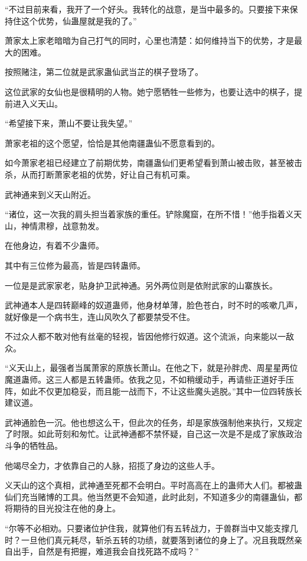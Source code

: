 
\begin{this_body}

“不过目前来看，我开了一个好头。我转化的战意，是当中最多的。只要接下来保持住这个优势，仙蛊屋就是我的了。”

萧家太上家老暗暗为自己打气的同时，心里也清楚：如何维持当下的优势，才是最大的困难。

按照赌注，第二位就是武家蛊仙武当芷的棋子登场了。

这位武家的女仙也是很精明的人物。她宁愿牺牲一些修为，也要让选中的棋子，提前进入义天山。

“希望接下来，萧山不要让我失望。”

萧家老祖的这个愿望，恰恰是其他南疆蛊仙不愿意看到的。

如今萧家老祖已经建立了前期优势，南疆蛊仙们更希望看到萧山被击败，甚至被击杀，从而打断萧家老祖的优势，好让自己有机可乘。

武神通来到义天山附近。

“诸位，这一次我的肩头担当着家族的重任。铲除魔窟，在所不惜！”他手指着义天山，神情肃穆，战意勃发。

在他身边，有着不少蛊师。

其中有三位修为最高，皆是四转蛊师。

一位是是武家家老，贴身护卫武神通。另外两位则是依附武家的山寨族长。

武神通本人是四转巅峰的奴道蛊师，他身材单薄，脸色苍白，时不时的咳嗽几声，就好像是一个病书生，连山风吹久了都要禁受不住。

不过众人都不敢对他有丝毫的轻视，皆因他修行奴道。这个流派，向来能以一敌众。

“义天山上，最强者当属萧家的原族长萧山。在他之下，就是孙胖虎、周星星两位魔道蛊师。这三人都是五转蛊师。依我之见，不如稍缓动手，再请些正道好手压阵，如此不仅更加稳妥，而且能一战而下，不让这些魔头逃脱。”其中一位四转族长建议道。

武神通脸色一沉。他也想这么干，但此次的任务，却是家族强制他来执行，又规定了时限。如此苛刻和匆忙。让武神通都不禁怀疑，自己这一次是不是成了家族政治斗争的牺牲品。

他竭尽全力，才依靠自己的人脉，招揽了身边的这些人手。

义天山的这个真相，武神通至死都不会明白。平时高高在上的蛊师大人们。都被蛊仙们充当赌博的工具。他当然更不会知道，此时此刻，不知道多少的南疆蛊仙，都将期待的目光投注在他的身上。

“尔等不必相劝。只要诸位护住我，就算他们有五转战力，于兽群当中又能支撑几时？一旦他们真元耗尽，斩杀五转的功绩，就要落到诸位的身上了。况且我既然亲自出手，自然是有把握，难道我会自找死路不成吗？”


\end{this_body}

